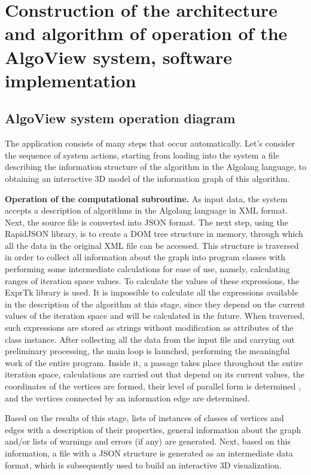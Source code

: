 \section{Construction of the architecture and algorithm of operation of the AlgoView system, software implementation}

\subsection{AlgoView system operation diagram}

The application consists of many steps that occur automatically. Let's consider the sequence of system actions, starting from loading into the system a file describing the information structure of the algorithm in the Algolang language, to obtaining an interactive 3D model of the information graph of this algorithm.

\textbf{Operation of the computational subroutine.} As input data, the system accepts a description of algorithms in the Algolang language in XML format. Next, the source file is converted into JSON format. The next step, using the RapidJSON library, is to create a DOM tree structure in memory, through which all the data in the original XML file can be accessed. This structure is traversed in order to collect all information about the graph into program classes with performing some intermediate calculations for ease of use, namely, calculating ranges of iteration space values. To calculate the values of these expressions, the ExprTk library is used. It is impossible to calculate all the expressions available in the description of the algorithm at this stage, since they depend on the current values of the iteration space and will be calculated in the future. When traversed, such expressions are stored as strings without modification as attributes of the class instance. After collecting all the data from the input file and carrying out preliminary processing, the main loop is launched, performing the meaningful work of the entire program. Inside it, a passage takes place throughout the entire iteration space, calculations are carried out that depend on its current values, the coordinates of the vertices are formed, their level of parallel form is determined \cite{m41}, and the vertices connected by an information edge are determined.

Based on the results of this stage, lists of instances of classes of vertices and edges with a description of their properties, general information about the graph and/or lists of warnings and errors (if any) are generated. Next, based on this information, a file with a JSON structure is generated as an intermediate data format, which is subsequently used to build an interactive 3D visualization.

